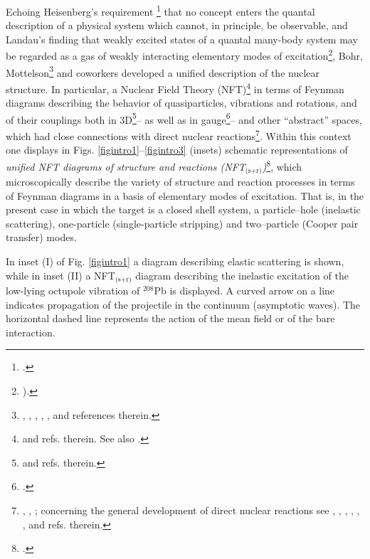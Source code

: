 Echoing Heisenberg's requirement \footnote{\cite{Heisenberg:49}.} that no concept enters the quantal description of a physical system which cannot, in principle, be observable, and Landau's finding that  weakly excited states of a quantal many-body system may be regarded as a gas of weakly interacting elementary modes of excitation\footnote{\cite{Landau:41}).}, Bohr, Mottelson\footnote{\cite{Bohr:64}, \cite{Bohr:69}, \cite{Bohr:76}, \cite{Mottelson:76}, \cite{Bohr:75}, \cite{Bohr:58} and references therein.} and coworkers developed a unified description of the nuclear  structure. In particular, a Nuclear Field Theory (NFT)\footnote{\cite{Bes:74,Broglia:76,Bohr:75,Bes:90,Mottelson:76} and refs. therein. See also \cite{Bohr:19}.} in terms of Feynman diagrams describing the behavior of quasiparticles, vibrations and rotations, and of their couplings both in 3D\footnote{\cite{Nilsson:55,Bohr:75} and refs. therein.}-- as well as in gauge\footnote{\cite{Bohr:58,Belyaev:59,Hogassen:61,Bes:66,Bjerregaard:66b,Broglia:67,Bohr:75}.}-- and other ``abstract'' spaces, which had  close connections with direct nuclear reactions\footnote{ \cite{Alder:56}, \cite{Alder:75}, \cite{Broglia:04a}; concerning the general development of direct nuclear reactions see \cite{Austern:70}, \cite{Jackson:70}, \cite{Satchler:80}, \cite{Satchler:83}, \cite{Brink:85}, \cite{Glendenning:04,Thompson:09}, and refs. therein.}. Within this context one displays in Figs. \ref{figintro1}--\ref{figintro3} (insets)  schematic representations of  \textit{unified NFT diagrams of structure and reactions (NFT$_{\text{(s+r)}}$)}\footnote{\cite{Broglia:75,Broglia:04a,Potel:13,Broglia:16}.}, which microscopically describe the variety of structure and reaction processes in terms of Feynman diagrams in a basis of elementary modes of excitation. That is, in the present case in which the target is a closed shell system, a particle--hole (inelastic scattering), one-particle (single-particle stripping) and two--particle (Cooper pair transfer) modes. 

In inset (I) of Fig. \ref{figintro1} a diagram describing elastic scattering is shown, while in inset (II) a NFT$_{\text{(s+r)}}$ diagram describing the inelastic excitation of the low-lying octupole vibration of $^{208}$Pb is displayed. A  curved arrow on a line indicates propagation of  the projectile in the continuum  (asymptotic waves). The horizontal dashed line represents the action of the mean field or of the  bare interaction. 


